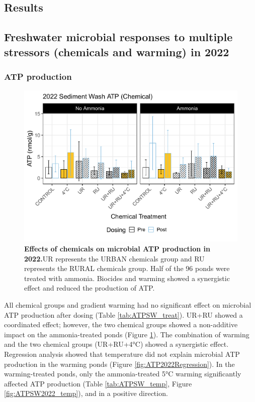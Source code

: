 \documentclass[11pt, a4paper]{article}
\begin{document}
\begin{spacing}{1.5}
\section{Results}

\subsection{Freshwater microbial responses to multiple stressors (chemicals and warming) in 2022}

\subsubsection{ATP production}

\begin{figure}[H]
    \centering
    \includegraphics[scale=0.55]{./Figures/ATPSW2022_bar_chem}
    \caption{\textbf{Effects of chemicals on microbial ATP production in 2022.}UR represents the URBAN chemicals group and RU represents the RURAL chemicals group. Half of the 96 ponds were treated with ammonia. Biocides and warming showed a synergistic effect and reduced the production of ATP. }
    \label{fig:ATPSW2022_cp}
\end{figure}

All chemical groups and gradient warming had no significant effect on microbial ATP production after dosing (Table \ref{tab:ATPSW_treat}). UR+RU showed a coordinated effect; however, the two chemical groups showed a non-additive impact on the ammonia-treated ponds (Figure \ref{fig:ATPSW2022_cp}). The combination of warming and the two chemical groups (UR+RU+4°C) showed a synergistic effect. Regression analysis showed that temperature did not explain microbial ATP production in the warming ponds (Figure \ref{fig:ATP2022Regression}). In the warming-treated ponds, only the ammonia-treated 5°C warming significantly affected ATP production (Table \ref{tab:ATPSW_temp}, Figure \ref{fig:ATPSW2022_temp}), and in a positive direction.


\end{spacing}
\end{document}
